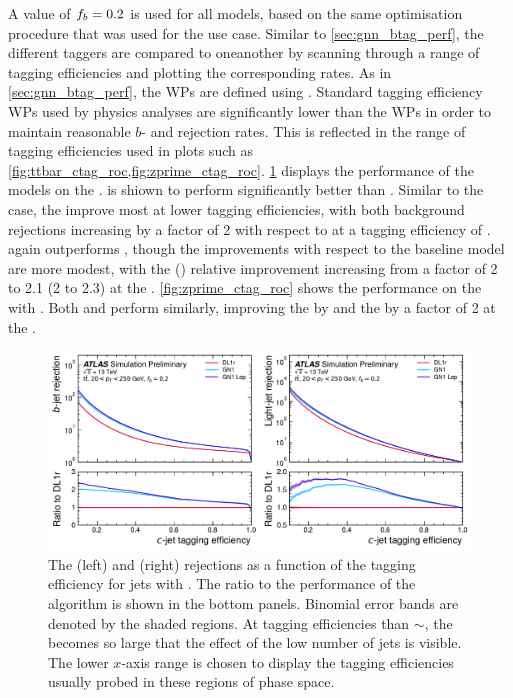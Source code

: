 A value of $f_b = 0.2$ is used for all models, based on the same optimisation procedure that was used for the \btag use case.
Similar to \cref{sec:gnn_btag_perf}, the different taggers are compared to oneanother by scanning through a range of \cjet tagging efficiencies and plotting the corresponding \blrej rates.
As in \cref{sec:gnn_btag_perf}, the WPs are defined using \ttbarjets.
Standard \cjet tagging efficiency WPs used by physics analyses are significantly lower than the \btag WPs in order to maintain reasonable $b$- and \ljet rejection rates.
This is reflected in the range of \cjet tagging efficiencies used in \ctag plots such as \cref{fig:ttbar_ctag_roc,fig:zprime_ctag_roc}.
\cref{fig:ttbar_ctag_roc} displays the \ctag performance of the models on the \ttbarjets.
\GNN is shiown to perform significantly better than \DLr.
Similar to the \btag case, the \blrej improve most at lower \cjet tagging efficiencies, with both background rejections increasing by a factor of 2 with respect to \DLr at a \cjet tagging efficiency of .
\GNNLep again outperforms \GNN, though the improvements with respect to the baseline model are more modest, with the \brej (\lrej) relative improvement increasing from a factor of 2 to 2.1 (2 to 2.3) at the .
\cref{fig:zprime_ctag_roc} shows the \ctag performance on the \Zprimejets with \Zprimept.
Both \GNN and \GNNLep perform similarly, improving the \brej by  and the \lrej by a factor of 2 at the .

\begin{figure}[!p]
    \centering
    \includegraphics[width=\textwidth]{chapters/gnn_tagger/figs/results/main/ttbar/ttbar_roc_ctag.pdf}
    \caption{
        The \bjet (left) and \ljet (right) rejections as a function of the \cjet tagging efficiency for \ttbar jets with \ttbarpt.
        The ratio to the performance of the \DLr algorithm is shown in the bottom panels.
        Binomial error bands are denoted by the shaded regions.
        At \cjet tagging efficiencies than $\sim$, the \lrej becomes so large that the effect of the low number of jets is visible.
        The lower $x$-axis range is chosen to display the \cjet tagging efficiencies usually probed in these regions of phase space.
    }
    \label{fig:ttbar_ctag_roc}
\end{figure}

